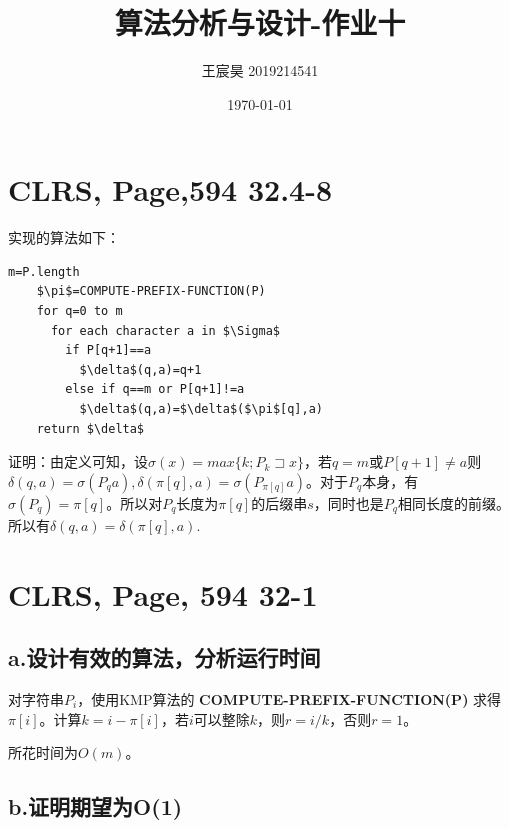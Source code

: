 \documentclass[UTF8]{ctexart}
\title{算法分析与设计-作业十}
\author{王宸昊 2019214541}
\date{\today}
\begin{document}
\maketitle


\section{CLRS, Page,594 32.4-8}

实现的算法如下：

\begin{lstlisting}[mathescape]
    m=P.length
    $\pi$=COMPUTE-PREFIX-FUNCTION(P)
    for q=0 to m
      for each character a in $\Sigma$
        if P[q+1]==a
          $\delta$(q,a)=q+1
        else if q==m or P[q+1]!=a
          $\delta$(q,a)=$\delta$($\pi$[q],a)
    return $\delta$
\end{lstlisting}

证明：由定义可知，设$\sigma (x)=max\{k;P_k \sqsupset x\}$，若$q=m$或$P[q+1]\neq a$则$\delta(q,a)=\sigma (P_q a),\delta(\pi[q],a)=\sigma (P_{\pi[q]} a)$。对于$P_q$本身，有$\sigma(P_q)=\pi[q]$。所以对$P_q$长度为$\pi[q]$的后缀串$s$，同时也是$P_q$相同长度的前缀。所以有$\delta(q,a)=\delta(\pi[q],a)$.



\section{CLRS, Page, 594 32-1}

\subsection{a.设计有效的算法，分析运行时间}

对字符串$P_i$，使用KMP算法的 \textbf{COMPUTE-PREFIX-FUNCTION(P)} 求得$\pi[i]$。计算$k=i-\pi[i]$，若$i$可以整除$k$，则$r=i/k$，否则$r=1$。

所花时间为$O(m)$。

\subsection{b.证明期望为O(1)}
\end{document}
